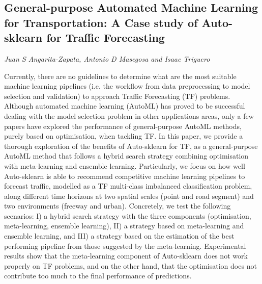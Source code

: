 \documentclass[../booklet.tex]{subfiles}
\begin{document}
\subsection[General-purpose Automated Machine Learning for Transportation: A Case study of Auto-sklearn for Traffic Forecasting. {\it Juan S Angarita-Zapata, Antonio D Masegosa and Isaac Triguero}]{General-purpose Automated Machine Learning for Transportation: A Case study of Auto-sklearn for Traffic Forecasting}
  

\begin{center}
  {\it Juan S Angarita-Zapata, Antonio D Masegosa and Isaac Triguero}
\end{center}

\vskip 0.8cm


Currently, there are no guidelines to determine what are the most suitable machine learning pipelines (i.e. the workflow from data preprocessing to model selection and validation) to approach Traffic Forecasting (TF) problems. Although automated machine learning (AutoML) has proved to be successful dealing with the model selection problem in other applications areas, only a few papers have explored the performance of general-purpose AutoML methods, purely based on optimisation, when tackling TF. In this paper, we provide a thorough exploration of the benefits of Auto-sklearn for TF, as a general-purpose AutoML method that follows a hybrid search strategy combining optimisation with meta-learning and ensemble learning. Particularly, we focus on how well Auto-sklearn is able to recommend competitive machine learning pipelines to forecast traffic, modelled as a TF multi-class imbalanced classification problem, along different time horizons at two spatial scales (point and road segment) and two environments (freeway and urban). Concretely, we test the following scenarios: I) a hybrid search strategy with the three components (optimisation, meta-learning, ensemble learning), II) a strategy based on meta-learning and ensemble learning, and III) a strategy based on the estimation of the best performing pipeline from those suggested by the meta-learning. Experimental results show that the meta-learning component of Auto-sklearn does not work properly on TF problems, and on the other hand, that the optimisation does not contribute too much to the final performance of predictions.

\end{document}
